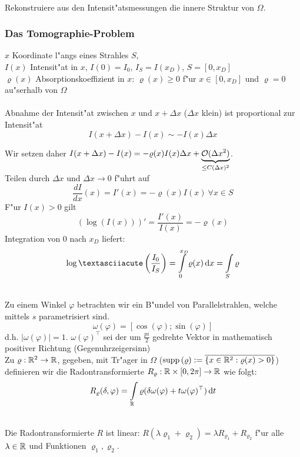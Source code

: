 \documentclass{scrartcl}
\begin{document}
 \\
Rekonstruiere aus den Intensit"atsmessungen die innere Struktur von $\Omega$.

\subsubsection{Das Tomographie-Problem}
$x$ Koordinate l"angs eines Strahles $S$, \\
$I(x)$ Intensit"at in $x$, $I(0) = I_0$, $I_S = I(x_D)$, $S = [ 0, x_D]$\\
$\varrho(x)$ Absorptionskoeffizient in $x$: $\varrho(x) \geq 0$ f"ur $x \in [0, x_D]$ und $\varrho = 0$ au"serhalb von $\Omega$ \\

 \\
Abnahme der Intensit"at zwischen $x$ und $x + \Delta x$ ($\Delta x$ klein) ist proportional zur Intensit"at 
$$I(x+ \Delta x) - I(x) \sim - I(x) \Delta x$$


Wir setzen daher $I(x + \Delta x) - I(x) = - \varrho(x) I(x) \Delta x + \underbrace{\mathcal{O}(\Delta x^2)}_{\leq C(\Delta x)^2}$. \\
Teilen durch $\Delta x$ und $\Delta x \rightarrow 0$ f"uhrt auf
$$ \frac{dI}{dx}(x) = I'(x) = - \varrho(x) I(x) \ \forall x \in S$$
F"ur $I(x) > 0$ gilt
$$(\log (I(x)))' = \frac{I'(x)}{I(x)} = - \varrho(x)$$
Integration von $0$ nach $x_D$ liefert:
$$ \log´\left(\frac{I_0}{I_S}\right) = \int\limits_{0}^{x_D} \varrho(x) \d x = \int\limits_{S} \varrho$$

 \\
Zu einem Winkel $\varphi$ betrachten wir ein B"undel von Parallelstrahlen, welche mittels $s$ parametrisiert sind.
$$\omega(\varphi) = [ \cos (\varphi); \sin(\varphi) ]$$
d.h. $\vert \omega(\varphi) \vert = 1$. $\omega(\varphi)^\top$ sei der um $\frac{pi}{2}$ gedrehte Vektor in mathematisch positiver Richtung (Gegenuhrzeigersinn) \\
Zu $\varrho: \mathbb{R}^2 \rightarrow \mathbb{R}$, gegeben, mit Tr"ager in $\Omega$ ($\mathrm{supp} \,(\varrho) := \overline{ \{ x \in \mathbb{R}^2: \varrho(x) > 0\} }$) definieren wir die Radontransformierte $R_\varrho: \mathbb{R} \times [0, 2 \pi] \rightarrow \mathbb{R}$ wie folgt:
$$R_{\varrho}(\delta, \varphi) = \int\limits_{\mathbb{R}} \varrho(\delta \omega(\varphi) + t \omega(\varphi)^\top) \, \mathrm{d} t$$

 \\
Die Radontransformierte $R$ ist linear:
$R(\lambda \varrho_1 + \varrho_2) = \lambda R_{\varrho_1} + R_{\varrho_2}$ f"ur alle $\lambda \in \mathbb{R}$ und Funktionen $\varrho_1, \varrho_2$.
\end{document}
